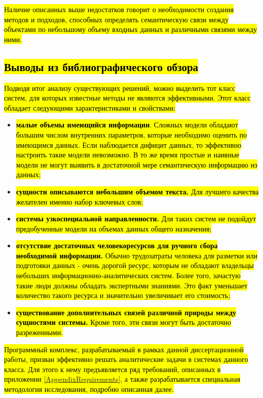 \hl{Наличие описанных выше недостатков говорит о необходимости создания методов и подходов, способных определять семантическую связи между объектами по небольшому объему входных данных и различными связями между ними.}

\subsection{\hl{Выводы из библиографического обзора}} \label{related_work_concl}

\hl{Подводя итог анализу существующих решений, можно выделить тот класс систем, для которых известные методы не являются эффективными. Этот класс обладает следующими характеристиками и свойствами:}

\begin{itemize}
    \item \hl{\textbf{малые объемы имеющийся информации}. Сложных  модели обладают большим числом внутренних параметров, которые необходимо оценить по имеющимся данных. Если наблюдается дифицит данных, то эффективно настроить такие модели невозможно. В то же время простые и наивные модели не могут выявить в достаточной мере семантическую информацию из данных;}
    \item \hl{\textbf{сущности описываются небольшим объемом текста.} Для лучшего качества желателен именно набор ключевых слов;}
    \item \hl{\textbf{системы узкоспециальной направленности.} Для таких систем не подойдут предобученные модели на объемах данных общего назначения;}
    \item \hl{\textbf{отсутствие достаточных человекоресурсов для ручного сбора необходимой информации.} Обычно трудозатраты человека для разметки или подготовки данных - очень дорогой ресурс, которым не обладают владельцы небольших информационно-аналитических систем. Более того, зачастую такие люди должны обладать экспертными знаниями. Это факт уменьшает количество такого ресурса и значительно увеличивает его стоимость;}
    \item \hl{\textbf{существование дополнительных связей различной природы между сущностями системы.} Кроме того, эти связи могут быть достаточно разреженными.}
\end{itemize}

\hl{Программный комплекс, разрабатываемый в рамках данной диссертационной работы, призван эффективно решать аналитические задачи в системах данного класса. Для этого к нему предъявляется ряд требований, описанных в приложении \ref{AppendixRequirements}, а также разрабатывается специальная методология исследования, подробно описанная далее.}

